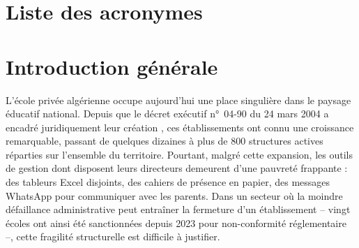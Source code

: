 \documentclass[12pt,a4paper,oneside]{report}
\begin{document}
\chapter*{Liste des acronymes}
\begin{acronym}[USTO-MB]
\end{acronym}

\chapter*{Introduction générale}

L'école privée algérienne occupe aujourd'hui une place singulière dans le paysage éducatif national. Depuis que le décret exécutif n°~04-90 du 24 mars 2004 a encadré juridiquement leur création \autocite{decret2004}, ces établissements ont connu une croissance remarquable, passant de quelques dizaines à plus de 800 structures actives réparties sur l'ensemble du territoire. Pourtant, malgré cette expansion, les outils de gestion dont disposent leurs directeurs demeurent d'une pauvreté frappante : des tableurs Excel disjoints, des cahiers de présence en papier, des messages WhatsApp pour communiquer avec les parents. Dans un secteur où la moindre défaillance administrative peut entraîner la fermeture d'un établissement -- vingt écoles ont ainsi été sanctionnées depuis 2023 pour non-conformité réglementaire --, cette fragilité structurelle est difficile à justifier.
\end{document}
